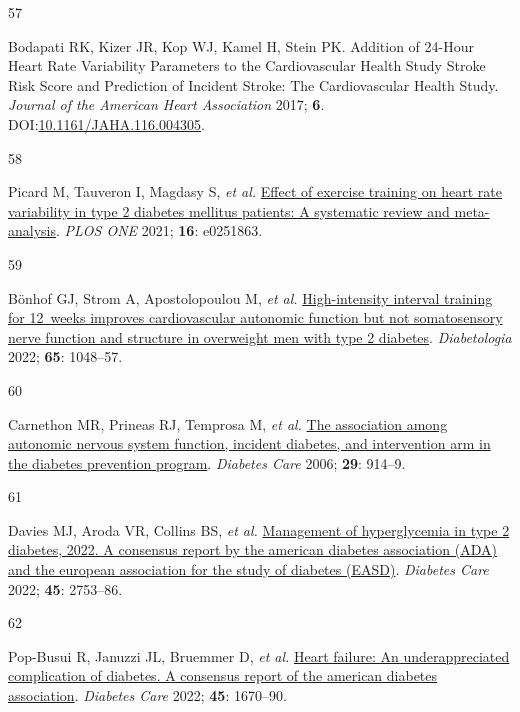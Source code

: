 \documentclass[
  a4paper,
  headsepline=true,
  open=any]{scrbook}
\newlength{\cslhangindent}
\newlength{\csllabelwidth}
\newlength{\cslentryspacingunit} %
\newenvironment{CSLReferences}[2] %
 {%
  \setlength{\parindent}{0pt}
  \ifodd #1
  \let\oldpar\par
  \def\par{\hangindent=\cslhangindent\oldpar}
  \fi
  \setlength{\parskip}{#2\cslentryspacingunit}
 }%
 {}
\newcommand{\CSLLeftMargin}[1]{\parbox[t]{\csllabelwidth}{#1}}
\newcommand{\CSLRightInline}[1]{\parbox[t]{\linewidth - \csllabelwidth}{#1}\break}
\begin{document}
\begin{CSLReferences}{0}{0}
\leavevmode{}%
\CSLLeftMargin{57 }%
\CSLRightInline{Bodapati RK, Kizer JR, Kop WJ, Kamel H, Stein PK.
Addition of 24-Hour Heart Rate Variability Parameters to the
Cardiovascular Health Study Stroke Risk Score and Prediction of Incident
Stroke: The Cardiovascular Health Study. \emph{Journal of the American
Heart Association} 2017; \textbf{6}.
DOI:\href{https://doi.org/10.1161/JAHA.116.004305}{10.1161/JAHA.116.004305}.}

\leavevmode{}%
\CSLLeftMargin{58 }%
\CSLRightInline{Picard M, Tauveron I, Magdasy S, \emph{et al.}
\href{https://doi.org/10.1371/journal.pone.0251863}{Effect of exercise
training on heart rate variability in type 2 diabetes mellitus patients:
A systematic review and meta-analysis}. \emph{PLOS ONE} 2021;
\textbf{16}: e0251863.}

\leavevmode{}%
\CSLLeftMargin{59 }%
\CSLRightInline{Bönhof GJ, Strom A, Apostolopoulou M, \emph{et al.}
\href{https://doi.org/10.1007/s00125-022-05674-w}{High-intensity
interval training for 12~weeks improves cardiovascular autonomic
function but not somatosensory nerve function and structure in
overweight men with type 2 diabetes}. \emph{Diabetologia} 2022;
\textbf{65}: 1048--57.}

\leavevmode{}%
\CSLLeftMargin{60 }%
\CSLRightInline{Carnethon MR, Prineas RJ, Temprosa M, \emph{et al.}
\href{https://doi.org/10.2337/diacare.29.04.06.dc05-1729}{The
association among autonomic nervous system function, incident diabetes,
and intervention arm in the diabetes prevention program}. \emph{Diabetes
Care} 2006; \textbf{29}: 914--9.}

\leavevmode{}%
\CSLLeftMargin{61 }%
\CSLRightInline{Davies MJ, Aroda VR, Collins BS, \emph{et al.}
\href{https://doi.org/10.2337/dci22-0034}{Management of hyperglycemia in
type 2 diabetes, 2022. A consensus report by the american diabetes
association (ADA) and the european association for the study of diabetes
(EASD)}. \emph{Diabetes Care} 2022; \textbf{45}: 2753--86.}

\leavevmode{}%
\CSLLeftMargin{62 }%
\CSLRightInline{Pop-Busui R, Januzzi JL, Bruemmer D, \emph{et al.}
\href{https://doi.org/10.2337/dci22-0014}{Heart failure: An
underappreciated complication of diabetes. A consensus report of the
american diabetes association}. \emph{Diabetes Care} 2022; \textbf{45}:
1670--90.}


\end{CSLReferences}
\end{document}
